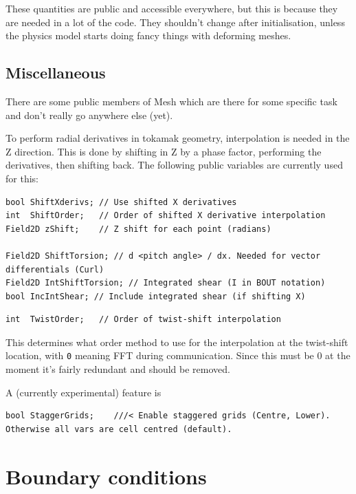 \documentclass[12pt]{article}
\newcommand{\code}[1]{\texttt{#1}}
\begin{document}
These quantities are public and accessible everywhere, but this is because
they are needed in a lot of the code. They shouldn't change
after initialisation, unless the physics model starts doing fancy things with
deforming meshes.

\subsection{Miscellaneous}

There are some public members of Mesh which are there for some specific
task and don't really go anywhere else (yet). 

To perform radial derivatives in tokamak geometry, interpolation is needed
in the Z direction. This is done by shifting in Z by a phase factor, performing
the derivatives, then shifting back. The following public variables are currently
used for this:
\begin{lstlisting}
bool ShiftXderivs; // Use shifted X derivatives
int  ShiftOrder;   // Order of shifted X derivative interpolation
Field2D zShift;    // Z shift for each point (radians)
  
Field2D ShiftTorsion; // d <pitch angle> / dx. Needed for vector differentials (Curl)
Field2D IntShiftTorsion; // Integrated shear (I in BOUT notation)
bool IncIntShear; // Include integrated shear (if shifting X)
\end{lstlisting}

\begin{lstlisting}
int  TwistOrder;   // Order of twist-shift interpolation
\end{lstlisting}
This determines what order method to use for the interpolation at the twist-shift
location, with \code{0} meaning FFT during communication. Since this must be 0 at the moment
it's fairly redundant and should be removed.

A (currently experimental) feature is 
\begin{lstlisting}
bool StaggerGrids;    ///< Enable staggered grids (Centre, Lower). Otherwise all vars are cell centred (default).
\end{lstlisting}

\section{Boundary conditions}
\label{sec:boundaries}
\end{document}
